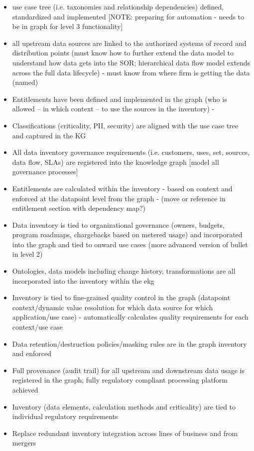 \kgmmscoringlevelTwo

\begin{itemize}
  \item use case tree (i.e. taxonomies and relationship dependencies) defined, standardized and implemented [NOTE: preparing for automation - needs to be in graph for level 3 functionality]
  \item all upstream data sources are linked to the authorized systems of record and distribution points (must know how to further extend the data model to understand how data gets into the SOR; hierarchical data flow model extends across the full data lifecycle) - must know from where firm is getting the data (named)
  \item Entitlements have been defined and implemented in the graph (who is allowed – in which context – to use the sources in the inventory) -
  \item Classifications (criticality, PII, security) are aligned with the use case tree and captured in the KG
  \item All data inventory governance requirements (i.e. customers, uses, set, sources, data flow, SLAs) are registered into the knowledge graph [model all governance processes]
\end{itemize}

\kgmmscoringlevelThree

\begin{itemize}
  \item Entitlements are calculated within the inventory - based on context and enforced at the datapoint level from the graph - (move or reference in entitlement section with dependency map?)
  \item Data inventory is tied to organizational governance (owners, budgets, program roadmaps, chargebacks based on metered usage) and incorporated into the graph and tied to onward use cases (more advanced version of bullet in level 2)
  \item Ontologies, data models including change history, transformations are all incorporated into the inventory within the \acrshort{ekg}
  \item Inventory is tied to fine-grained quality control in the graph (datapoint context/dynamic value resolution for which data source for which application/use case) - automatically calculates quality requirements for each context/use case
  \item Data retention/destruction policies/masking rules are in the graph inventory and enforced
  \item Full provenance (audit trail) for all upstream and downstream data usage is registered in the graph; fully regulatory compliant processing platform achieved
  \item Inventory (data elements, calculation methods and criticality) are tied to individual regulatory requirements
  \item Replace redundant inventory integration across lines of business and from mergers
\end{itemize}

